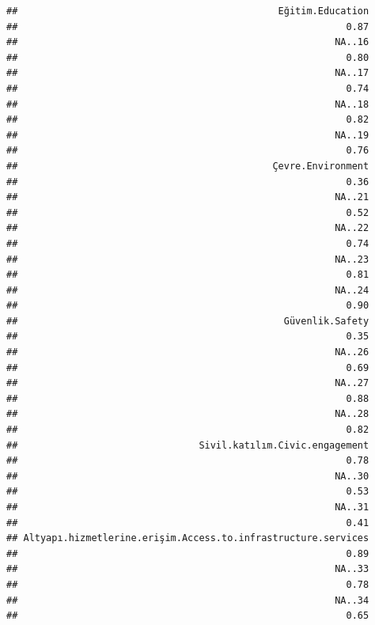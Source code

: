 \documentclass[
]{article}
\begin{document}
\begin{verbatim}
##                                              Eğitim.Education 
##                                                          0.87 
##                                                        NA..16 
##                                                          0.80 
##                                                        NA..17 
##                                                          0.74 
##                                                        NA..18 
##                                                          0.82 
##                                                        NA..19 
##                                                          0.76 
##                                             Çevre.Environment 
##                                                          0.36 
##                                                        NA..21 
##                                                          0.52 
##                                                        NA..22 
##                                                          0.74 
##                                                        NA..23 
##                                                          0.81 
##                                                        NA..24 
##                                                          0.90 
##                                               Güvenlik.Safety 
##                                                          0.35 
##                                                        NA..26 
##                                                          0.69 
##                                                        NA..27 
##                                                          0.88 
##                                                        NA..28 
##                                                          0.82 
##                                Sivil.katılım.Civic.engagement 
##                                                          0.78 
##                                                        NA..30 
##                                                          0.53 
##                                                        NA..31 
##                                                          0.41 
## Altyapı.hizmetlerine.erişim.Access.to.infrastructure.services 
##                                                          0.89 
##                                                        NA..33 
##                                                          0.78 
##                                                        NA..34 
##                                                          0.65 

\end{verbatim}
\end{document}
